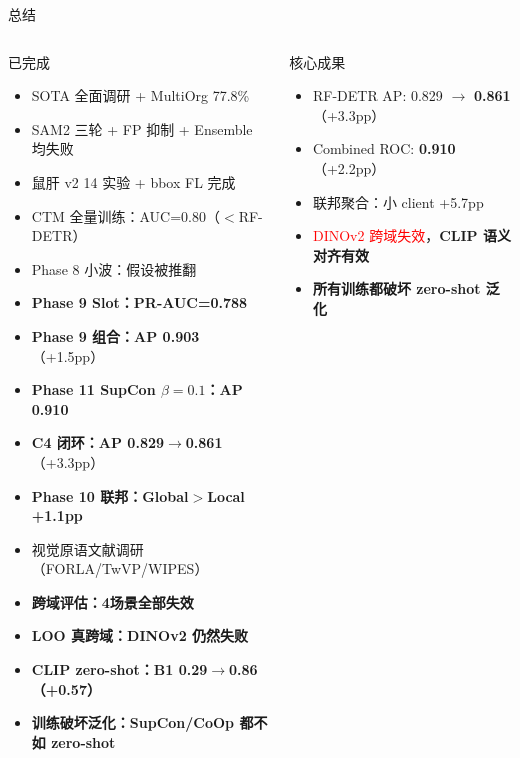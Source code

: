 \documentclass[aspectratio=169, 10pt]{beamer}
\begin{document}
\begin{frame}{总结}
  \begin{columns}[T]
    \begin{block}{已完成}
      \begin{itemize}
        \item[\checkmark] SOTA 全面调研 + MultiOrg 77.8\%
        \item[\checkmark] SAM2 三轮 + FP 抑制 + Ensemble 均失败
        \item[\checkmark] 鼠肝 v2 14 实验 + bbox FL 完成
        \item[\checkmark] CTM 全量训练：AUC=0.80（$<$RF-DETR）
        \item[\checkmark] Phase 8 小波：假设被推翻
        \item[\checkmark] \textbf{Phase 9 Slot：PR-AUC=0.788}
        \item[\checkmark] \textbf{Phase 9 组合：AP 0.903}（+1.5pp）
        \item[\checkmark] \textbf{Phase 11 SupCon $\beta=0.1$：AP 0.910}
        \item[\checkmark] \textbf{C4 闭环：AP 0.829$\to$0.861}（+3.3pp）
        \item[\checkmark] \textbf{Phase 10 联邦：Global$>$Local +1.1pp}
        \item[\checkmark] 视觉原语文献调研（FORLA/TwVP/WIPES）
        \item[\checkmark] \textbf{跨域评估：4场景全部失效}
        \item[\checkmark] \textbf{LOO 真跨域：DINOv2 仍然失败}
        \item[\checkmark] \textbf{CLIP zero-shot：B1 0.29$\to$0.86（+0.57）}
        \item[\checkmark] \textbf{训练破坏泛化：SupCon/CoOp 都不如 zero-shot}
      \end{itemize}
    \end{block}
    \begin{alertblock}{核心成果}
      \begin{itemize}
        \item RF-DETR AP: 0.829 $\to$ \textbf{0.861}（+3.3pp）
        \item Combined ROC: \textbf{0.910}（+2.2pp）
        \item 联邦聚合：小 client +5.7pp
        \item \textcolor{red}{DINOv2 跨域失效}，\textbf{CLIP 语义对齐有效}
        \item \textbf{所有训练都破坏 zero-shot 泛化}

\end{itemize}
\end{alertblock}
\end{columns}
\end{frame}
\end{document}
